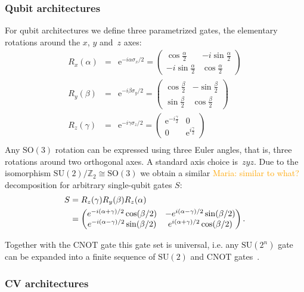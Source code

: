 \documentclass[aps,pra,10pt,twocolumn,groupedaddress,nofootinbib]{revtex4-1}
\theoremstyle{plain}
\newcommand{\isom}{\cong} %
\newcommand{\bpm}{\begin{pmatrix}}
\newcommand{\epm}{\end{pmatrix}}
\newcommand{\Z}{\ensuremath{\mathbb Z}}  %
\newcommand{\SO}{\text{SO}} %
\newcommand{\SU}{\text{SU}} %
\newcommand{\CNOT}{\text{CNOT}}
\newcommand{\e}{\mathrm{e}}
\newcommand{\maria}[1]{\textcolor{orange}{Maria: #1}}
\begin{document}
\subsubsection{Qubit architectures}

For qubit architectures we define three parametrized gates,
the elementary rotations around the $x$, $y$ and~$z$ axes:
\begin{eqnarray*}
        R_x(\alpha) &=& \e^{-i\alpha \sigma_x/2} =
        \begin{pmatrix}
          \cos \frac{\alpha}{2} & -i \sin \frac{\alpha}{2}\\
          -i \sin \frac{\alpha}{2} & \cos \frac{\alpha}{2}
        \end{pmatrix}\\
        R_y(\beta) &=& \e^{-i\beta \sigma_y/2} =
        \begin{pmatrix}
          \cos \frac{\beta}{2} & -\sin \frac{\beta}{2}\\
          \sin \frac{\beta}{2} & \cos \frac{\beta}{2}
        \end{pmatrix}\\
        R_z(\gamma) &=& \e^{-i\gamma \sigma_z/2}=
        \begin{pmatrix}
          \e^{-i \frac{\gamma}{2}} & 0\\
          0 & \e^{i \frac{\gamma}{2}}
        \end{pmatrix}\\
\end{eqnarray*}
Any $\SO(3)$ rotation can be expressed using three Euler angles, that is, three rotations around two orthogonal axes. A standard axis choice is~$zyz$. Due to the isomorphism $\SU(2)/\Z_2 \isom \SO(3)$ we obtain a similar \maria{similar to what?} decomposition
for arbitrary single-qubit gates $S$:
\begin{align}
\label{eq:app:euler}
\notag
S &= R_z(\gamma) R_y(\beta) R_z(\alpha)\\
&=
\bpm
e^{-i(\alpha+\gamma)/2} \cos(\beta/2) & -e^{i(\alpha-\gamma)/2} \sin(\beta/2)\\
e^{-i(\alpha-\gamma)/2} \sin(\beta/2) &  e^{i(\alpha+\gamma)/2} \cos(\beta/2)
\epm.
\end{align}

Together with the $\CNOT$ gate this gate set is universal, i.e. any $\SU(2^n)$
gate can be expanded into a finite sequence of $\SU(2)$ and $\CNOT$ gates~\cite{barenco1995}.\\

\subsubsection{CV architectures}
\end{document}
